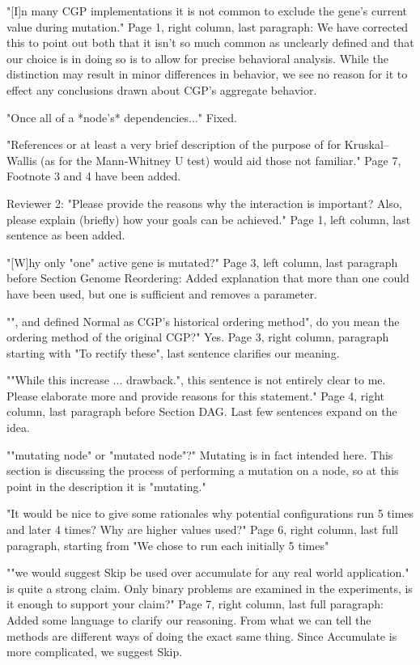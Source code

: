 \documentclass{letter}
\begin{document}
\begin{letter}{}
"[I]n many CGP implementations it is not common to exclude the gene's current value during mutation."
Page 1, right column, last paragraph: We have corrected this to point out both that it isn't
so much common as unclearly defined and that our choice is in doing so is to allow
for precise behavioral analysis.  While the distinction may result in minor differences in behavior,
we see no reason for it to effect any conclusions drawn about CGP's aggregate behavior.

"Once all of a *node's* dependencies..."
Fixed.

"References or at least a very brief description of the purpose of for
Kruskal–Wallis (as for the Mann-Whitney U test) would aid those not familiar."
Page 7, Footnote 3 and 4 have been added.


Reviewer 2:
"Please provide the reasons why the interaction is important? Also, please explain (briefly) how your goals can be achieved."
Page 1, left column, last sentence as been added.

"[W]hy only "one" active gene is mutated?"
Page 3, left column, last paragraph before Section Genome Reordering: Added explanation that more than
one could have been used, but one is sufficient and removes a parameter.

"", and defined Normal as CGP's historical ordering method", do you mean the ordering method of the original CGP?"
Yes.  Page 3, right column, paragraph starting with "To rectify these", last sentence clarifies our meaning.

""While this increase ... drawback.", this sentence is not entirely clear to me. Please elaborate more and provide reasons for this statement."
Page 4, right column, last paragraph before Section DAG.  Last few sentences expand on the idea.

""mutating node" or "mutated node"?"
Mutating is in fact intended here.  This section is discussing the process of performing
a mutation on a node, so at this point in the description it is "mutating."

"It would be nice to give some rationales why potential configurations run 5 times and later 4 times? Why are higher values used?"
Page 6, right column, last full paragraph, starting from "We chose to run each initially 5 times"

""we would suggest Skip be used over accumulate for any real world application." is quite a strong claim. Only binary problems are examined in the experiments, is it enough to support your claim?"
Page 7, right column, last full paragraph: Added some language to clarify our reasoning.  From what we can tell
the methods are different ways of doing the exact same thing.  Since Accumulate is more complicated, we suggest Skip.


\end{letter}
\end{document}
